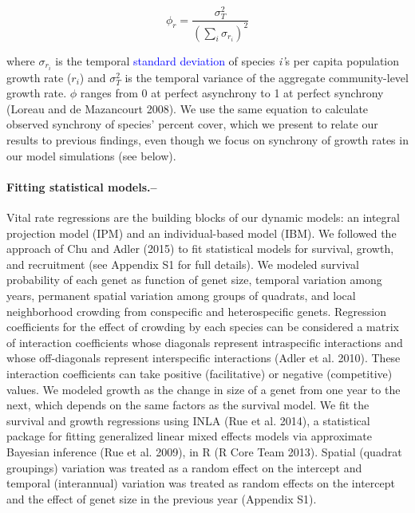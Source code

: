 \documentclass[11pt,]{article}
\begin{document}
\begin{equation}
\phi_r = \frac{\sigma^{2}_{T}}{(\sum_{i}\sigma_{r_{i}})^{2}}
\end{equation}

\noindent where \(\sigma_{r_{i}}\) is the temporal
\textcolor{blue}{standard deviation} of species \emph{i'}s per capita
population growth rate (\(r_i\)) and \(\sigma^{2}_{T}\) is the temporal
variance of the aggregate community-level growth rate. \(\phi\) ranges
from 0 at perfect asynchrony to 1 at perfect synchrony (Loreau and {{de
Mazancourt}} 2008). We use the same equation to calculate observed
synchrony of species' percent cover, which we present to relate our
results to previous findings, even though we focus on synchrony of
growth rates in our model simulations (see below).

\paragraph{Fitting statistical
models.--}\label{fitting-statistical-models.}

Vital rate regressions are the building blocks of our dynamic models: an
integral projection model (IPM) and an individual-based model (IBM). We
followed the approach of Chu and Adler (2015) to fit statistical models
for survival, growth, and recruitment (see Appendix S1 for full
details). We modeled survival probability of each genet as function of
genet size, temporal variation among years, permanent spatial variation
among groups of quadrats, and local neighborhood crowding from
conspecific and heterospecific genets. Regression coefficients for the
effect of crowding by each species can be considered a matrix of
interaction coefficients whose diagonals represent intraspecific
interactions and whose off-diagonals represent interspecific
interactions (Adler et al. 2010). These interaction coefficients can
take positive (facilitative) or negative (competitive) values. We
modeled growth as the change in size of a genet from one year to the
next, which depends on the same factors as the survival model. We fit
the survival and growth regressions using INLA (Rue et al. 2014), a
statistical package for fitting generalized linear mixed effects models
via approximate Bayesian inference (Rue et al. 2009), in R (R Core Team
2013). Spatial (quadrat groupings) variation was treated as a random
effect on the intercept and temporal (interannual) variation was treated
as random effects on the intercept and the effect of genet size in the
previous year (Appendix S1).
\end{document}
